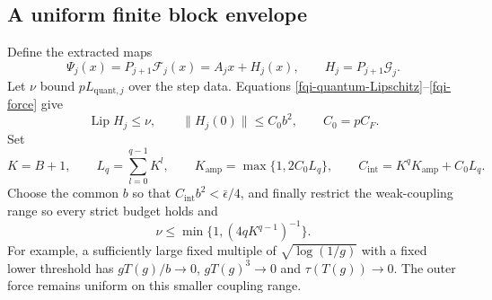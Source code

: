 \documentclass[11pt]{article}
\theoremstyle{remark}
\begin{document}
\subsection{A uniform finite block envelope}
\label{fqi-envelope-section}

Define the extracted maps
\begin{equation}
 \Psi_j(x)=P_{j+1}\mathcal F_j(x)=A_jx+H_j(x),\qquad
 H_j=P_{j+1}\mathcal G_j.
 \label{fqi-extracted-map}
\end{equation}
Let $\nu$ bound $pL_{\mathrm{quant},j}$ over the step data.
Equations \eqref{fqi-quantum-Lipschitz}--\eqref{fqi-force} give
\begin{equation}
 \operatorname{Lip}H_j\le\nu,\qquad
 \|H_j(0)\|\le C_0b^2,\qquad C_0=pC_F.
 \label{fqi-perturbation-bounds}
\end{equation}
Set
\begin{equation}
 K=B+1,\qquad L_q=\sum_{l=0}^{q-1}K^l,\qquad
 K_{\mathrm{amp}}=\max\{1,2C_0L_q\},\qquad
 C_{\mathrm{int}}=K^qK_{\mathrm{amp}}+C_0L_q.
 \label{fqi-envelope-constants}
\end{equation}
Choose the common $b$ so that $C_{\mathrm{int}}b^2<\bar\epsilon/4$,
and finally restrict the weak-coupling range so every strict
budget holds and
\begin{equation}
 \nu\le\min\{1,(4qK^{q-1})^{-1}\}.
 \label{fqi-nu-choice}
\end{equation}
For example, a sufficiently large fixed multiple of
$\sqrt{\log(1/g)}$ with a fixed lower threshold has
$gT(g)/b\to0$, $gT(g)^3\to0$ and $\tau(T(g))\to0$.
The outer force remains uniform on this smaller coupling range.
\end{document}

